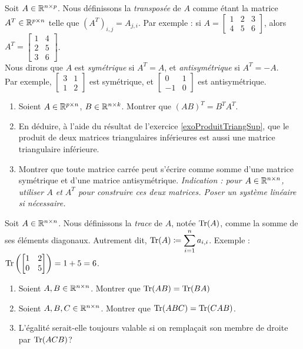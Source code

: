 \begin{exercice}
\noindent Soit $A \in \mathbb{R}^{n \times p}$. Nous définissons la \textit{transposée} de $A$ comme étant la matrice $A^T \in \mathbb{R}^{p \times n}$ telle que $(A^T)_{i,j} = A_{j,i}$. 
Par exemple : si $A = \begin{bmatrix}
1 & 2 & 3\\
4 & 5 & 6
\end{bmatrix}$, alors $A^T = \begin{bmatrix}
1 & 4\\
2 & 5 \\
3 & 6
\end{bmatrix}$.\\

\noindent Nous dirons que $A$ est \textit{symétrique} si $A^T=A$, et \textit{antisymétrique} si $A^T=-A$. \\
Par exemple, $\begin{bmatrix} 3 & 1 \\ 1 & 2 \end{bmatrix}$ est symétrique, et $\begin{bmatrix} 0 & 1 \\ -1 & 0 \end{bmatrix}$ est antisymétrique. \\

\begin{enumerate}
    \item Soient $A \in \mathbb{R}^{p \times n}$, $B \in \mathbb{R}^{n \times k}$. Montrer que $(AB)^T = B^T A^T$.
    \item En déduire, à l'aide du résultat de l'exercice \ref{exoProduitTriangSup}, que le produit de deux matrices triangulaires inférieures est aussi une matrice triangulaire inférieure.
    \item Montrer que toute matrice carrée peut s'écrire comme somme d'une matrice symétrique et d'une matrice antisymétrique. \textit{Indication : pour $A \in \mathbb{R}^{n \times n}$, utiliser $A$ et $A^T$ pour construire ces deux matrices. Poser un système linéaire si nécessaire.} \\
\end{enumerate}
\end{exercice}

\begin{exercice}
\noindent Soit $A \in \mathbb{R}^{n \times n}$. Nous définissons la \textit{trace} de $A$, notée $\text{Tr}(A)$, comme la somme de ses éléments diagonaux. Autrement dit, $\displaystyle \text{Tr}(A) \coloneqq \sum_{i=1}^{n} a_{i,i}$. Exemple : $\text{Tr}\left(\begin{bmatrix}
1 & 2\\
0 & 5
\end{bmatrix}\right) = 1 + 5 = 6$.
\begin{enumerate}
    \item Soient $A,B \in \mathbb{R}^{n \times n}$. Montrer que $\text{Tr}(AB)=\text{Tr}(BA)$
    \item Soient $A,B,C \in \mathbb{R}^{n \times n}$. Montrer que $\text{Tr}(ABC)=\text{Tr}(CAB)$.
    \item L'égalité serait-elle toujours valable si on remplaçait son membre de droite par $\text{Tr}(ACB)$? \\
\end{enumerate}
\end{exercice}

